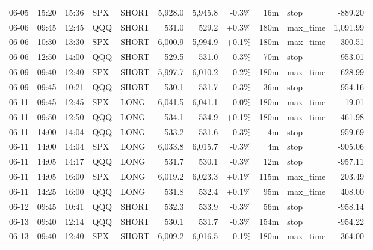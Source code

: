 \documentclass[11pt,a4paper,twoside]{article}
\begin{document}
\begin{center}
\begin{longtable}{>{\color{txtmain}}l l l l l r r r r >{\color{txtmain}}l r}
06-05 & 15:20 & 15:36 & SPX & SHORT & 5,928.0 & 5,945.8 & \textcolor{lossred}{-0.3\%} & 16m & stop & \textcolor{lossred}{-889.20} \\
06-06 & 09:45 & 12:45 & QQQ & SHORT & 531.0 & 529.2 & \textcolor{wingreen}{+0.3\%} & 180m & max\_time & \textcolor{wingreen}{1,091.99} \\
06-06 & 10:30 & 13:30 & SPX & SHORT & 6,000.9 & 5,994.9 & \textcolor{wingreen}{+0.1\%} & 180m & max\_time & \textcolor{wingreen}{300.51} \\
06-06 & 12:50 & 14:00 & QQQ & SHORT & 529.5 & 531.0 & \textcolor{lossred}{-0.3\%} & 70m & stop & \textcolor{lossred}{-953.01} \\
06-09 & 09:40 & 12:40 & SPX & SHORT & 5,997.7 & 6,010.2 & \textcolor{lossred}{-0.2\%} & 180m & max\_time & \textcolor{lossred}{-628.99} \\
06-09 & 09:45 & 10:21 & QQQ & SHORT & 530.1 & 531.7 & \textcolor{lossred}{-0.3\%} & 36m & stop & \textcolor{lossred}{-954.16} \\
06-11 & 09:45 & 12:45 & SPX & LONG & 6,041.5 & 6,041.1 & \textcolor{lossred}{-0.0\%} & 180m & max\_time & \textcolor{lossred}{-19.01} \\
06-11 & 09:50 & 12:50 & QQQ & LONG & 534.1 & 534.9 & \textcolor{wingreen}{+0.1\%} & 180m & max\_time & \textcolor{wingreen}{461.98} \\
06-11 & 14:00 & 14:04 & QQQ & LONG & 533.2 & 531.6 & \textcolor{lossred}{-0.3\%} & 4m & stop & \textcolor{lossred}{-959.69} \\
06-11 & 14:00 & 14:04 & SPX & LONG & 6,033.8 & 6,015.7 & \textcolor{lossred}{-0.3\%} & 4m & stop & \textcolor{lossred}{-905.06} \\
06-11 & 14:05 & 14:17 & QQQ & LONG & 531.7 & 530.1 & \textcolor{lossred}{-0.3\%} & 12m & stop & \textcolor{lossred}{-957.11} \\
06-11 & 14:05 & 16:00 & SPX & LONG & 6,019.2 & 6,023.3 & \textcolor{wingreen}{+0.1\%} & 115m & max\_time & \textcolor{wingreen}{203.49} \\
06-11 & 14:25 & 16:00 & QQQ & LONG & 531.8 & 532.4 & \textcolor{wingreen}{+0.1\%} & 95m & max\_time & \textcolor{wingreen}{408.00} \\
06-12 & 09:45 & 10:41 & QQQ & SHORT & 532.3 & 533.9 & \textcolor{lossred}{-0.3\%} & 56m & stop & \textcolor{lossred}{-958.14} \\
06-13 & 09:40 & 12:14 & QQQ & SHORT & 530.1 & 531.7 & \textcolor{lossred}{-0.3\%} & 154m & stop & \textcolor{lossred}{-954.22} \\
06-13 & 09:40 & 12:40 & SPX & SHORT & 6,009.2 & 6,016.5 & \textcolor{lossred}{-0.1\%} & 180m & max\_time & \textcolor{lossred}{-364.00} \\

\end{longtable}
\end{center}
\end{document}
